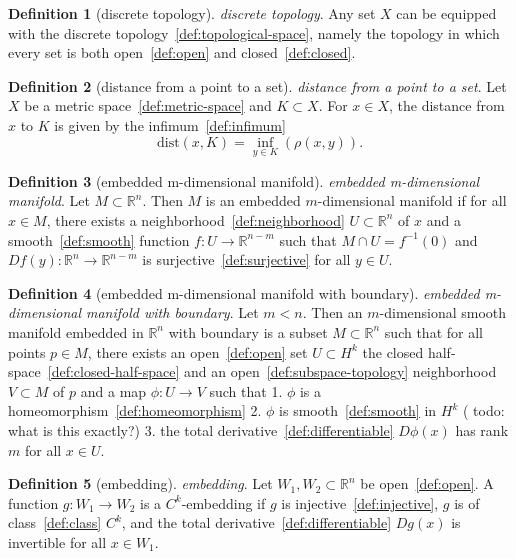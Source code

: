 \documentclass[12pt,a4paper]{article}
\theoremstyle{definition}
\newtheorem{definition}{Definition}
\begin{document}
\begin{definition}[discrete topology]\label{def:discrete-topology}
\emph{discrete topology}. Any set $X$ can be equipped with the discrete topology~\ref{def:topological-space}, namely the topology in which every set is both open~\ref{def:open} and closed~\ref{def:closed}.
\end{definition}

\begin{definition}[distance from a point to a set]\label{def:distance-from-a-point-to-a-set}
\emph{distance from a point to a set}. Let $X$ be a metric space~\ref{def:metric-space} and $K \subset X$. For $x \in X$, the distance from $x$ to $K$ is given by the infimum~\ref{def:infimum} $$\text{dist}(x,K) = \inf_{y\in K}(\rho(x, y)).$$
\end{definition}

\begin{definition}[embedded m-dimensional manifold]\label{def:embedded-m-dimensional-manifold}
\emph{embedded m-dimensional manifold}. Let $M\subset\mathbb R^n$. Then $M$ is an embedded $m$-dimensional manifold if for all $x\in M$, there exists a neighborhood~\ref{def:neighborhood} $U \subset\mathbb R^n$ of $x$ and a smooth~\ref{def:smooth} function $f:U\to\mathbb R^{n-m}$  such that $M\cap U = f^{-1}(0)$ and $Df(y):\mathbb R^n\to\mathbb R^{n-m}$ is surjective~\ref{def:surjective} for all $y \in U$.
\end{definition}

\begin{definition}[embedded m-dimensional manifold with boundary]\label{def:embedded-m-dimensional-manifold-with-boundary}
\emph{embedded m-dimensional manifold with boundary}. Let $m< n$. Then an $m$-dimensional smooth manifold embedded in $\mathbb R^n$ with boundary is a subset $M \subset\mathbb R^n$ such that for all points $p \in M$, there exists an open~\ref{def:open} set $U \subset H^k$ the closed half-space~\ref{def:closed-half-space} and an open~\ref{def:subspace-topology} neighborhood $V \subset M$ of $p$ and a map $\phi: U \to V$ such that 
1. $\phi$ is a homeomorphism~\ref{def:homeomorphism}
2. $\phi$ is smooth~\ref{def:smooth} in $H^k$ ( todo: what is this exactly?)
3. the total derivative~\ref{def:differentiable} $D\phi(x)$ has rank $m$ for all $x \in U$.
\end{definition}

\begin{definition}[embedding]\label{def:embedding}
\emph{embedding}. Let $W_1,W_2 \subset \mathbb R^n$ be open~\ref{def:open}. A function $g: W_1\to W_2$ is a $C^k$-embedding if $g$ is injective~\ref{def:injective}, $g$ is of class~\ref{def:class} $C^k$, and the total derivative~\ref{def:differentiable} $Dg(x)$ is invertible for all $x \in W_1$.
\end{definition}
\end{document}
